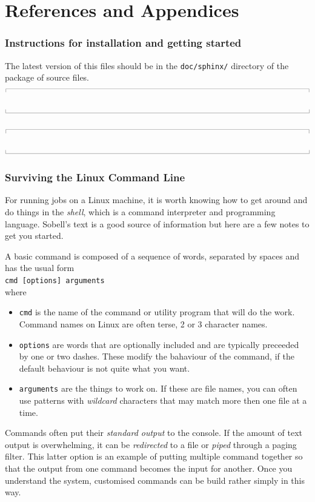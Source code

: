\documentclass[12pt,a4paper,twoside]{article}
\newcommand{\topbar}{\ensuremath{
    \rule{0.1mm}{2.0mm} \rule[2.0mm]{159.5mm}{0.1mm} \rule{0.1mm}{2.0mm}
}}
\newcommand{\bottombar}{\ensuremath{
    \rule{0.1mm}{2.0mm} \rule{159.5mm}{0.1mm} \rule{0.1mm}{2.0mm}
}}
\begin{document}
\part{References and Appendices}




\cleardoublepage
\appendix

\section{Instructions for installation and getting started}
\label{getting-started-file}
%
The latest version of this files should be in the \texttt{doc/sphinx/} directory 
of the package of source files.\\
\topbar

\bottombar

\noindent
\topbar

\bottombar

\cleardoublepage
\section{Surviving the Linux Command Line}
\label{linux-command-notes-sec}
For running jobs on a Linux machine, it is worth knowing how to get around and do things in the \textit{shell},
which is a command interpreter and programming language.
Sobell's text \cite{sobell_2005a} is a good source of information but here are a few notes to get you started.

\medskip
A basic command is composed of a sequence of words, separated by spaces and has the usual form\\
\texttt{cmd [options] arguments}\\
where 
\begin{itemize}
 \item\texttt{cmd} is the name of the command or utility program that will do the work.
   Command names on Linux are often terse, 2 or 3 character names.
 \item\texttt{options} are words that are optionally included and are typically preceeded by one or two dashes.
   These modify the bahaviour of the command, if the default behaviour is not quite what you want.
 \item \texttt{arguments} are the things to work on.
   If these are file names, you can often use patterns with \textit{wildcard} characters that may match
   more then one file at a time.
\end{itemize}
Commands often put their \textit{standard output} to the console.
If the amount of text output is overwhelming, it can be \textit{redirected} to a file 
or \textit{piped} through a paging filter.
This latter option is an example of putting multiple command together so that the output from
one command becomes the input for another.
Once you understand the system, customised commands can be build rather simply in this way.
\end{document}
